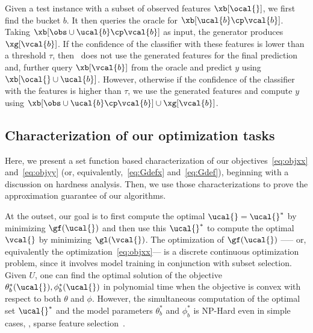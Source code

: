 \documentclass[letterpaper]{article}
\renewcommand{\cite}{\citep}
\begin{document}

 Given a test instance with a subset of observed features $\xb[\ocal{}]$, we first find the bucket $b$.
It then queries the oracle for $\xb[\ucal{b}\cp \vcal{b}]$. Taking $\xb[\obs \cup \ucal{b}\cp \vcal{b}]$ as input, the generator produces $\xg[\vcal{b}]$. 
If the confidence of the classifier with these features  is lower than a threshold $\tau$, then \our\ does not use the generated features for the final prediction and, further query  $\xb[\vcal{b}]$
from the oracle and predict $y$ using $\xb[\ocal{}\cup \ucal{b}]$.
However, otherwise if the confidence of the classifier with the features is higher than $\tau$, we use the generated features and compute $y$ using $\xb[\obs\cup  \ucal{b} \cp \vcal{b}]\cup \xg[\vcal{b}]$.

 \subsection{Characterization of our optimization tasks}
 Here, we present a set function based characterization of our objectives~\eqref{eq:objxx} and~\eqref{eq:objyy} (or, equivalently,~\eqref{eq:Gdefx} and~\eqref{eq:Gdef}), beginning with a discussion on hardness analysis. Then, we use those characterizations to prove the approximation guarantee of our algorithms. 
 
 At the outset, our goal is to first compute the optimal $\ucal{} = \ucal{}^*$ by minimizing $\gf(\ucal{})$
and then use this $\ucal{}^*$ to compute the optimal $\vcal{}$ by minimizing $\gl(\vcal{})$.
The optimization of $\gf(\ucal{})$ ----- or, equivalently the optimization~\eqref{eq:objxx}--- is a discrete continuous optimization problem, since it involves model training in conjunction with subset selection. 
 Given $U$, one can find the optimal solution of the objective $\theta_b ^*(\ucal{}), \phi_b ^*(\ucal{})$ in polynomial time when the objective is convex with respect to both $\theta$ and $\phi$. 
However, the simultaneous computation of
the optimal set $\ucal{} ^*$ and the model parameters $\theta_b ^*$ and $\phi_b ^*$
is NP-Hard even in simple cases, \eg,  
sparse feature selection~\cite{elenberg2018restricted}. 
\end{document}
